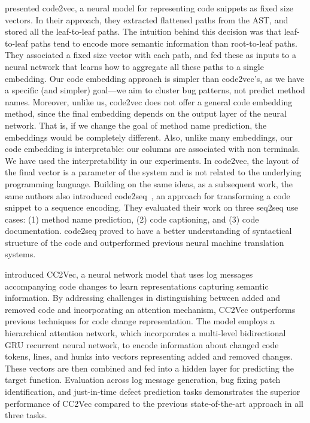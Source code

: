 \cite{alon2019code2vec} presented code2vec, a neural model for representing code snippets as fixed size vectors. In their approach, they extracted flattened paths from the AST, and stored all the leaf-to-leaf paths. The intuition behind this decision was that leaf-to-leaf paths tend to encode more semantic information than root-to-leaf paths. They associated a fixed size vector with each path, and fed these as inputs to a neural network that learns how to aggregate all these paths to a single embedding. Our code embedding approach is simpler than code2vec's, as we have a specific (and simpler) goal---we aim to cluster bug patterns, not predict method names. Moreover, unlike us, code2vec does not offer a general code embedding method, since the final embedding depends on the output layer of the neural network. That is, if we change the goal of method name prediction, the embeddings would be completely different. Also, unlike many embeddings, our code embedding is interpretable: our columns are associated with non terminals. We have used the interpretability in our experiments. In code2vec, the layout of the final vector is a parameter of the system and  is not related to the underlying programming language. Building on the same ideas, as a subsequent work, the same authors also introduced code2seq~\citep{alon2019code2seq}, an approach for transforming a code snippet to a sequence encoding. They evaluated their work on three seq2seq use cases: (1) method name prediction, (2) code captioning, and (3) code documentation. code2seq proved to have a better understanding of syntactical structure of the code and outperformed previous neural machine translation systems.

\cite{hoang2020cc2vec} introduced CC2Vec, a neural network model that uses log messages accompanying code changes to learn representations capturing semantic information. By addressing challenges in distinguishing between added and removed code and incorporating an attention mechanism, CC2Vec outperforms previous techniques for code change representation. The model employs a hierarchical attention network, which incorporates a multi-level bidirectional GRU recurrent neural network, to encode information about changed code tokens, lines, and hunks into vectors representing added and removed changes. These vectors are then combined and fed into a hidden layer for predicting the target function. Evaluation across log message generation, bug fixing patch identification, and just-in-time defect prediction tasks demonstrates the superior performance of CC2Vec compared to the previous state-of-the-art approach in all three tasks.

